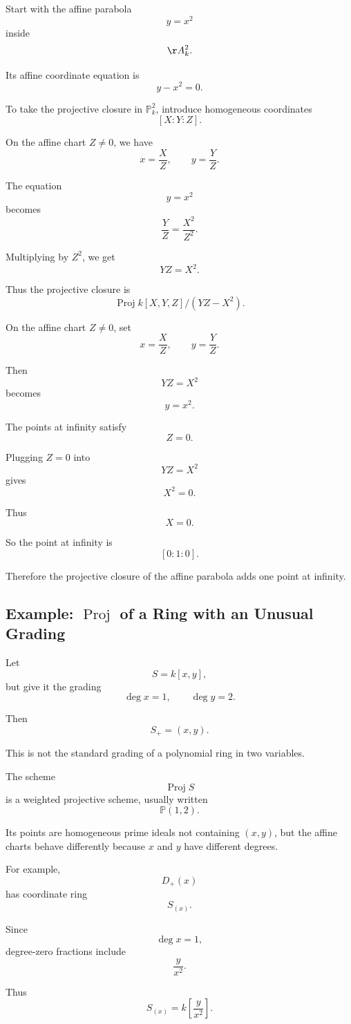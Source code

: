 \documentclass[12pt,a4paper]{article}
\DeclareMathOperator{\Proj}{Proj}
\newcommand{\PP}{\mathbb P}
\theoremstyle{notespace}
\begin{document}
Start with the affine parabola
\[
y=x^2
\]
inside
\[
\AA_k^2.
\]

Its affine coordinate equation is
\[
y-x^2=0.
\]

To take the projective closure in \(\PP_k^2\), introduce homogeneous coordinates
\[
[X:Y:Z].
\]

On the affine chart \(Z\neq 0\), we have
\[
x=\frac{X}{Z},
\qquad
y=\frac{Y}{Z}.
\]

The equation
\[
y=x^2
\]
becomes
\[
\frac{Y}{Z}
=
\frac{X^2}{Z^2}.
\]

Multiplying by \(Z^2\), we get
\[
YZ=X^2.
\]

Thus the projective closure is
\[
\Proj k[X,Y,Z]/(YZ-X^2).
\]

On the affine chart \(Z\neq 0\), set
\[
x=\frac{X}{Z},
\qquad
y=\frac{Y}{Z}.
\]

Then
\[
YZ=X^2
\]
becomes
\[
y=x^2.
\]

The points at infinity satisfy
\[
Z=0.
\]

Plugging \(Z=0\) into
\[
YZ=X^2
\]
gives
\[
X^2=0.
\]

Thus
\[
X=0.
\]

So the point at infinity is
\[
[0:1:0].
\]

Therefore the projective closure of the affine parabola adds one point at infinity.

\subsection{Example: \texorpdfstring{$\Proj$}{Proj} of a Ring with an Unusual Grading}

Let
\[
S=k[x,y],
\]
but give it the grading
\[
\deg x=1,
\qquad
\deg y=2.
\]

Then
\[
S_+=(x,y).
\]

This is not the standard grading of a polynomial ring in two variables.

The scheme
\[
\Proj S
\]
is a weighted projective scheme, usually written
\[
\PP(1,2).
\]

Its points are homogeneous prime ideals not containing \((x,y)\), but the affine charts behave differently because \(x\) and \(y\) have different degrees.

For example,
\[
D_+(x)
\]
has coordinate ring
\[
S_{(x)}.
\]

Since
\[
\deg x=1,
\]
degree-zero fractions include
\[
\frac{y}{x^2}.
\]

Thus
\[
S_{(x)}
=
k\left[\frac{y}{x^2}\right].
\]
\end{document}
